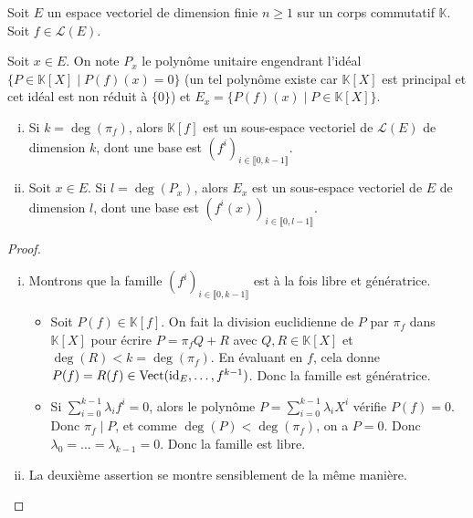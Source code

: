 






	Soit $E$ un espace vectoriel de dimension finie $n \geq 1$ sur un corps commutatif $\mathbb{K}$. Soit $f \in \mathcal{L}(E)$.

	\begin{notation}
		Soit $x \in E$. On note $P_x$ le polynôme unitaire engendrant l'idéal $\{ P \in \mathbb{K}[X] \mid P(f)(x) = 0 \}$ (un tel polynôme existe car $\mathbb{K}[X]$ est principal et cet idéal est non réduit à $\{ 0 \}$) et $E_x = \{ P(f)(x) \mid P \in \mathbb{K}[X] \}$.
	\end{notation}

	\begin{lemma}
		\label{invariants-de-similitude-1}
		\begin{enumerate}[(i)]
			\item Si $k = \deg(\pi_f)$, alors $\mathbb{K}[f]$ est un sous-espace vectoriel de $\mathcal{L}(E)$ de dimension $k$, dont une base est $(f^i)_{i \in \llbracket 0, k-1 \rrbracket}$.
			\item Soit $x \in E$. Si $l = \deg(P_x)$, alors $E_x$ est un sous-espace vectoriel de $E$ de dimension $l$, dont une base est $(f^i(x))_{i \in \llbracket 0, l-1 \rrbracket}$.
		\end{enumerate}
	\end{lemma}


	\begin{proof}
		\begin{enumerate}[(i)]
			\item Montrons que la famille $(f^i)_{i \in \llbracket 0, k-1 \rrbracket}$ est à la fois libre et génératrice.
			\begin{itemize}
				\item Soit $P(f) \in \mathbb{K}[f]$. On fait la division euclidienne de $P$ par $\pi_f$ dans $\mathbb{K}[X]$ pour écrire $P = \pi_f Q + R$ avec $Q, R \in \mathbb{K}[X]$ et $\deg(R) < k = \deg(\pi_f)$. En évaluant en $f$, cela donne $P(f) = R(f) \in \operatorname{Vect}(\operatorname{id}_E, \dots, f^{k-1})$. Donc la famille est génératrice.
				\item Si $\sum_{i=0}^{k-1} \lambda_i f^i = 0$, alors le polynôme $P = \sum_{i=0}^{k-1} \lambda_i X^i$ vérifie $P(f) = 0$. Donc $\pi_f \mid P$, et comme $\deg(P) < \deg(\pi_f)$, on a $P = 0$. Donc $\lambda_0 = \dots = \lambda_{k-1} = 0$. Donc la famille est libre.
			\end{itemize}
			\item La deuxième assertion se montre sensiblement de la même manière.
		\end{enumerate}
	\end{proof}

